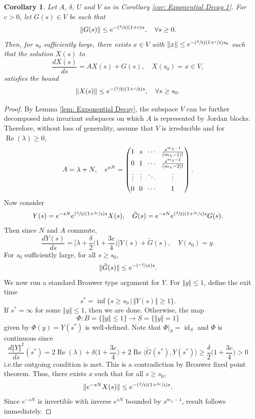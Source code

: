\documentclass[10pt]{article}
\newcommand{\ie}{i.e.}
\newcommand{\Psfrac}[2]{(\sfrac{#1}{#2})}
\theoremstyle{plain}
\newtheorem{corollary}[proposition]{Corollary}
\theoremstyle{definition}
\DeclareMathOperator{\id}{id}
\def\Re{\operatorname{Re}}
\begin{document}
\begin{corollary}
\label{cor: Exponential Decay 2}
Let $A$, $\delta$, $U$ and $V$ as in \emph{Corollary \ref{cor: Exponential Decay 1}}. For $c>0$, let $G(s)\in V$ be such that
\[
\Vert G(s)\Vert\le e^{-\Psfrac{\delta}{2}(1+c)s},\quad \forall s\ge 0.
\]
Then, for $s_0$ sufficiently large, there exists $x\in V$ with $\Vert x\Vert\le e^{-\Psfrac{\delta}{2}(1+\sfrac{c}{2})s_0}$ such that the solution $X(s)$ to
\[
\frac{dX(s)}{ds}=AX(s)+G(s),\quad X(s_0)=x\in V,
\]
satisfies the bound
\[
\Vert X(s)\Vert \le e^{-\Psfrac{\delta}{2}(1+\sfrac{c}{2})s},\quad \forall s\ge s_0.
\]
\end{corollary}
\begin{proof}
By Lemma \ref{lem: Exponential Decay}, the subspace $V$ can be further decomposed into invariant subspaces on which $A$ is represented by Jordan blocks. Therefore, without loss of generality, assume that $V$ is irreducible and for $\Re(\lambda)\ge0$,
\begin{equation}
\label{eq: Jordan Block}
\arraycolsep3.5pt
A=\lambda+N,\quad e^{sN}=
\begin{pmatrix}
1 & s& \cdots & \tfrac{s^{m_\lambda-1}}{(m_\lambda -1)!}\\[3pt]
0 & 1 & \cdots & \tfrac{s^{m_\lambda-2}}{(m_\lambda -2)!}\\[3pt]
\vdots & \vdots &\ddots& \vdots\\[3pt]
0 & 0 & \cdots & 1
\end{pmatrix}.
\end{equation}
Now consider
\[
Y(s)= e^{-sN}e^{\Psfrac{\delta}{2}(1+\sfrac{3c}{4})s}X(s),\quad \tilde G(s)=e^{-sN}e^{\Psfrac{\delta}{2}(1+\sfrac{3c}{4})s}G(s).
\]
Then since $N$ and $A$ commute,
\[
\frac{dY(s)}{ds}=\Big[\lambda+\frac{\delta}{2}\Big(1+\frac{3c}{4}\Big)\Big]Y(s)+\tilde G(s),\quad Y(s_0)=y.
\]
For $s_0$ sufficiently large, for all $s\ge s_0$,
\[
\Vert\tilde G(s)\Vert \le e^{-\Psfrac{c\,\delta}{16}s}.
\]
We now run a standard Brouwer type argument for $Y$. For $\Vert y \Vert \le 1$, define the exit time
\[
s^*=\inf\{s\ge s_0\,|\, \Vert Y(s)\Vert\ge1\}.
\]
If $s^*=\infty$ for some $\Vert y\Vert \le 1$, then we are done. Otherwise, the map
\[
\Phi:B=\{\Vert y\Vert \le1\}\to S=\{\Vert y\Vert =1\}
\]
given by $\Phi(y)=Y(s^*)$ is well-defined. Note that $\Phi|_{S}=\id_S$ and $\Phi$ is continuous since
\[
\frac{d\Vert Y\Vert^2}{ds}(s^*)=2\Re(\lambda)+\delta\Big(1+\frac{3c}{4}\Big)+2\Re\langle \tilde G(s^*),Y(s^*)\rangle\ge \frac{\delta}{2}\Big(1+\frac{3c}{4}\Big)>0
\]
\ie the outgoing condition is met. This is a contradiction by Brouwer fixed point theorem. Thus, there exists $x$ such that for all $s\ge s_0$,
\[
\Vert e^{-sN}X(s)\Vert \le e^{-\Psfrac{\delta}{2}(1+\sfrac{3c}{4})s}.
\]
Since $e^{-sN}$ is invertible with inverse $e^{sN}$ bounded by $s^{m_\lambda-1}$, result follows immediately.
\end{proof}
\end{document}
